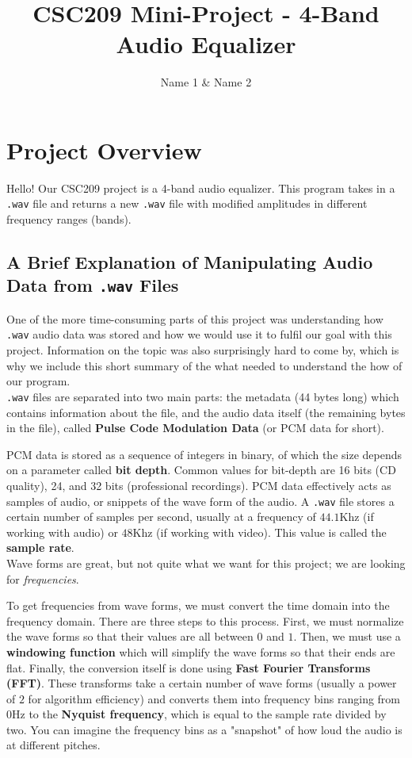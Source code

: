 \documentclass{article}
\title{CSC209 Mini-Project - 4-Band Audio Equalizer}
\author{Name 1 & Name 2}
\begin{document}
\maketitle

\section{Project Overview}\label{desc}

Hello! Our CSC209 project is a 4-band audio equalizer. This program takes in a \texttt{.wav} file and returns a new \texttt{.wav} file with modified amplitudes in different frequency ranges (bands).

\subsection{A Brief Explanation of Manipulating Audio Data from \texttt{.wav} Files}\label{wav}

One of the more time-consuming parts of this project was understanding how \texttt{.wav} audio data was stored and how we would use it to fulfil our goal with this project. Information on the topic was also surprisingly hard to come by, which is why we include this short summary of the what needed to understand the how of our program. \\

\texttt{.wav} files are separated into two main parts: the metadata (44 bytes long) which contains information about the file, and the audio data itself (the remaining bytes in the file), called \textbf{Pulse Code Modulation Data} (or PCM data for short).

PCM data is stored as a sequence of integers in binary, of which the size depends on a parameter called \textbf{bit depth}. Common values for bit-depth are 16 bits (CD quality), 24, and 32 bits (professional recordings). PCM data effectively acts as samples of audio, or snippets of the wave form of the audio. A \texttt{.wav} file stores a certain number of samples per second, usually at a frequency of $44.1$Khz (if working with audio) or $48$Khz (if working with video). This value is called the \textbf{sample rate}.\\

Wave forms are great, but not quite what we want for this project; we are looking for \textit{frequencies}.

To get frequencies from wave forms, we must convert the time domain into the frequency domain. There are three steps to this process. First, we must normalize the wave forms so that their values are all between $0$ and $1$. Then, we must use a \textbf{windowing function} which will simplify the wave forms so that their ends are flat. Finally, the conversion itself is done using \textbf{Fast Fourier Transforms (FFT)}. These transforms take a certain number of wave forms (usually a power of $2$ for algorithm efficiency) and converts them into frequency bins ranging from $0$Hz to the \textbf{Nyquist frequency}, which is equal to the sample rate divided by two. You can imagine the frequency bins as a "snapshot" of how loud the audio is at different pitches.\\
\end{document}
